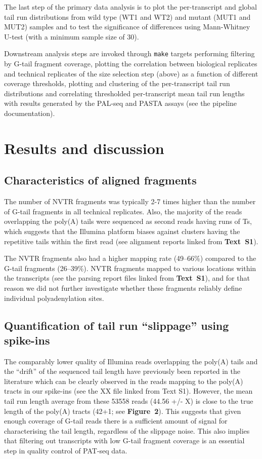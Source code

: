 \documentclass[10pt]{article}
\begin{document}
The last step of the primary data analysis is to plot the per-transcript and global tail run distributions from wild type (WT1 and WT2) and mutant (MUT1 and MUT2) samples and to test the significance of differences using Mann-Whitney U-test (with a minimum sample size of 30).

Downstream analysis steps are invoked through \texttt{make} targets performing filtering by G-tail fragment coverage, plotting the correlation between biological replicates and technical replicates of the size selection step (above) as a function of different coverage thresholds, plotting and clustering of the per-transcript tail run distributions and correlating thresholded per-transcript mean tail run lengths with results generated by the PAL-seq \cite{subtelny14} and PASTA \cite{beilharz07} assays (see the pipeline documentation).

\section*{Results and discussion}

\subsection*{Characteristics of aligned fragments}

The number of NVTR fragments was typically 2-7 times higher than the number of G-tail fragments in all technical replicates. Also, the majority of the reads overlapping the poly(A) tails were sequenced as second reads having runs of Ts, which suggests that the Illumina platform biases against clusters having the repetitive tails within the first read (see alignment reports linked from \textbf{Text~S1}).

The NVTR fragments also had a higher mapping rate (49--66\%) compared to the G-tail fragments (26--39\%).  NVTR fragments mapped to various locations within the transcripts (see the parsing report files linked from \textbf{Text~S1}), and for that reason we did not further investigate whether these fragments reliably define individual polyadenylation sites.

\subsection*{Quantification of tail run “slippage” using spike-ins}

The comparably lower quality of Illumina reads overlapping the poly(A) tails and the “drift” of the sequenced tail length have previously been reported in the literature \cite{wilkening13} which can be clearly observed in the reads mapping to the poly(A) tracts in our spike-ins (see the XX file linked from Text S1). However, the mean tail run length average from these 53558 reads (44.56 +/- X) is close to the true length of the poly(A) tracts (42+1; see \textbf{Figure~2}). This suggests that given enough coverage of G-tail reads there is a sufficient amount of signal for characterising the tail length, regardless of the slippage noise. This also implies that filtering out transcripts with low G-tail fragment coverage is an essential step in quality control of PAT-seq 
data.
\end{document}
